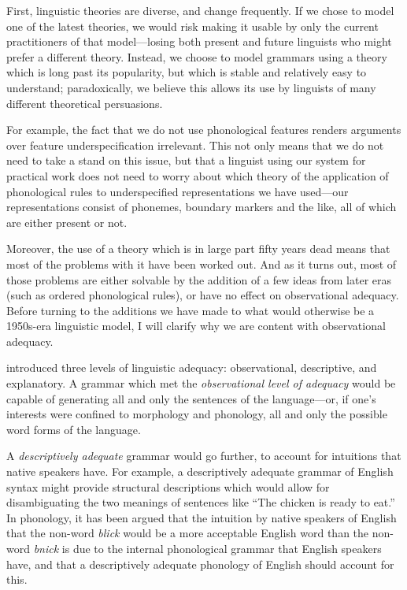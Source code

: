 First, linguistic theories are diverse, and change frequently. If we chose to model one of the latest theories, we would risk making it usable by only the current practitioners of that model---losing both present and future linguists who might prefer a different theory. Instead, we choose to model grammars using a theory which is long past its popularity, but which is stable and relatively easy to understand;  paradoxically, we believe this allows its use by linguists of many different theoretical persuasions. 

For example, the fact that we do not use phonological features renders arguments over feature underspecification irrelevant. This not only means that we do not need to take a stand on this issue, but that a linguist using our system for practical work does not need to worry about which theory of the application of phonological rules to underspecified representations we have used---our representations consist of phonemes, boundary markers and the like, all of which are either present or not.

Moreover, the use of a theory which is in large part fifty years dead means that most of the problems with it have been worked out. And as it turns out, most of those problems are either solvable by the addition of a few ideas from later eras (such as ordered phonological rules), or have no effect on observational adequacy. Before turning to the additions we have made to what would otherwise be a 1950s-era linguistic model, I will clarify why we are content with observational adequacy.

\citet{Chomsky1964,Chomsky1965} introduced three levels of linguistic adequacy: observational, descriptive, and explanatory. A grammar which met the {\textit{observational level of adequacy}}  would be capable of generating all and only the sentences of the language---or, if one's interests were confined to morphology and phonology, all and only the possible word forms of the language. 

A {\textit{descriptively adequate}} grammar would go further, to account for intuitions that native speakers have. For example, a descriptively adequate grammar of English syntax might provide structural descriptions which would allow for disambiguating the two meanings of sentences like ``The chicken is ready to eat.'' In phonology, it has been argued \citep{ChomskyEtAl1965} that the intuition by native speakers of English that the non-word {\textit{blick}} would be a more acceptable English word than the non-word {\textit{bnick}} is due to the internal phonological grammar that English speakers have, and that a descriptively adequate phonology of English should account for this.  

